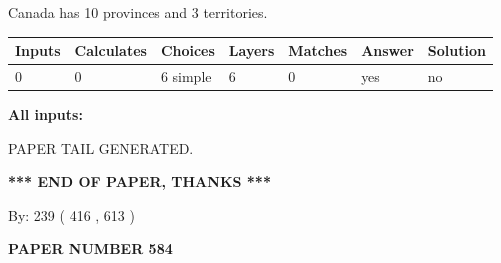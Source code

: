 \documentclass[12pt]{article}
\begin{document}
 
\noindent{}
 
 
Canada has 10  provinces and 3 territories.
 
 
\noindent{}
 
 
   
   
   
   
\noindent\begin{tabular}{|l|l|l|l|l|l|l|}
 \hline
Inputs & Calculates & Choices & Layers & Matches & Answer & Solution \\ \hline
 0  & 
 0  & 
 6
  simple  
  & 
 6  & 
 0  & 
  yes & 
  no 
  \\ \hline
 \end{tabular}
   
   
   
   
\noindent{}
   
   
   
   
\noindent\vspace{0.1in}\hspace{-0.08in} {\textbf{\Large{All inputs: }}}
   
   
   
   
   
   
 \vspace{0.2in}
 
   
   
\vspace{2.0in} PAPER TAIL GENERATED.
   
   
   
   
\vspace{1.0in} 
{\textbf{\large{ *** END OF PAPER, THANKS *** }}} 
   
   
\hspace{1.0in} By: 
 239 ( 416 ,  613 )
   
   
   
   
\newpage 
\setcounter{page}{ 
   584001 } 
   
   
   
   
 {\textbf{ \Large{ PAPER NUMBER  584  }}}
   
   
\vspace{0.2in}
   
   
   
\end{document}
